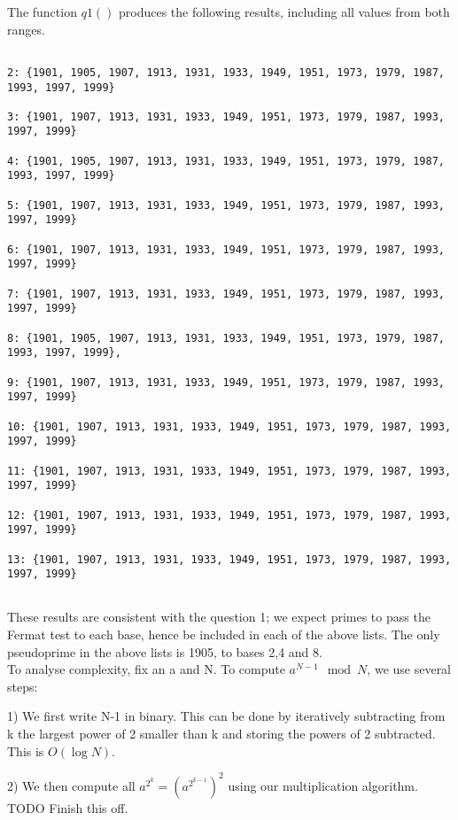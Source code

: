 \documentclass[10pt,a4paper]{report}
\begin{document}
The function $q1()$ produces the following results, including all values from both ranges.

\begin{lstlisting}[breaklines]

2: {1901, 1905, 1907, 1913, 1931, 1933, 1949, 1951, 1973, 1979, 1987, 1993, 1997, 1999}

3: {1901, 1907, 1913, 1931, 1933, 1949, 1951, 1973, 1979, 1987, 1993, 1997, 1999}

4: {1901, 1905, 1907, 1913, 1931, 1933, 1949, 1951, 1973, 1979, 1987, 1993, 1997, 1999}

5: {1901, 1907, 1913, 1931, 1933, 1949, 1951, 1973, 1979, 1987, 1993, 1997, 1999}

6: {1901, 1907, 1913, 1931, 1933, 1949, 1951, 1973, 1979, 1987, 1993, 1997, 1999}

7: {1901, 1907, 1913, 1931, 1933, 1949, 1951, 1973, 1979, 1987, 1993, 1997, 1999}
 
8: {1901, 1905, 1907, 1913, 1931, 1933, 1949, 1951, 1973, 1979, 1987, 1993, 1997, 1999}, 
 
9: {1901, 1907, 1913, 1931, 1933, 1949, 1951, 1973, 1979, 1987, 1993, 1997, 1999}
 
10: {1901, 1907, 1913, 1931, 1933, 1949, 1951, 1973, 1979, 1987, 1993, 1997, 1999}
 
11: {1901, 1907, 1913, 1931, 1933, 1949, 1951, 1973, 1979, 1987, 1993, 1997, 1999}
 
12: {1901, 1907, 1913, 1931, 1933, 1949, 1951, 1973, 1979, 1987, 1993, 1997, 1999}
 
13: {1901, 1907, 1913, 1931, 1933, 1949, 1951, 1973, 1979, 1987, 1993, 1997, 1999}
 
\end{lstlisting}

These results are consistent with the question 1; we expect primes to pass the Fermat test to each base, hence be included in each of the above lists. The only pseudoprime in the above lists is 1905, to bases 2,4 and 8.\\


To analyse complexity, fix an a and N. To compute $a^{N-1}\mod N$, we use several steps:

1) We first write N-1 in binary. This can be done by iteratively subtracting from k the largest power of 2 smaller than k and storing the powers of 2 subtracted. This is $O(\log{N})$.

2) We then compute all $a^{2^k} =  (a^{2^{k-1}})^2$ using our multiplication algorithm. 	TODO Finish this off.
\end{document}
